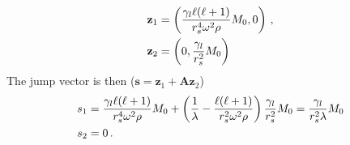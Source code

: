 \documentclass[12pt,a4paper]{article}
\begin{document}
\begin{align}
\mathbf{z}_1 &= \left(\frac{\gamma_l\ell(\ell+1)}{r_s^4\omega^2\rho}M_0, 0\right) \,, \notag \\
\mathbf{z}_2 &= \left(0, \frac{\gamma_l}{r_s^2}M_0\right)
\end{align}
The jump vector is then ($\mathbf{s} = \mathbf{z}_1+\mathbf{A}\mathbf{z}_2$)
\begin{align}
s_1 &=   \frac{\gamma_l\ell(\ell+1)}{r_s^4\omega^2\rho}M_0 +\left(\frac{1}{\lambda}-\frac{\ell(\ell+1)}{r_s^2\omega^2\rho}\right)\frac{\gamma_l}{r_s^2}M_0 = \frac{\gamma_l}{r_s^2\lambda}M_0 \notag \\
s_2 &= 0 \,.
\end{align}
\end{document}
